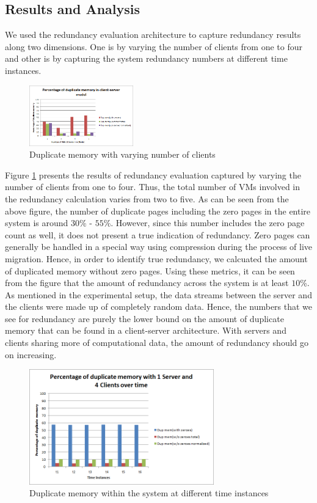 \documentclass{acm_proc_article-sp}
\begin{document}
\subsection{Results and Analysis}
We used the redundancy evaluation architecture to capture redundancy results along two dimensions. One is by varying the number of clients from one to four and other is by capturing the system redundancy numbers at different time instances.

\begin{figure}[htbp]
\centering
        \includegraphics[width=0.4\textwidth]{images/client-server1.png}
    \caption{Duplicate memory with varying number of clients}
    \label{fig:client-server1}
\end{figure}

Figure \ref{fig:client-server1} presents the results of redundancy evaluation captured by varying the number of clients from one to four. Thus, the total number of VMs involved in the redundancy calculation varies from two to five. As can be seen from the above figure, the number of duplicate pages including the zero pages in the entire system is around $30$\% - $55$\%.	However, since this number includes the zero page count as well, it does not present a true indication of redundancy. Zero pages can generally be handled in a special way using compression during the process of live migration. Hence, in order to identify true redundancy, we calcuated the amount of duplicated memory without zero pages. Using these metrics, it can be seen from the figure that the amount of redundancy across the system is at least $10$\%. As mentioned in the experimental setup, the data streams between the server and the clients were made up of completely random data. Hence, the numbers that we see for redundancy are purely the lower bound on the amount of duplicate memory that can be found in a client-server architecture. With servers and clients sharing more of computational data, the amount of redundancy should go on increasing.

\begin{figure}[htbp]
\centering
        \includegraphics[width=8cm]{images/client-server2.png}
    \caption{Duplicate memory within the system at different time instances}
    \label{fig:client-server2}
\end{figure}
\end{document}
